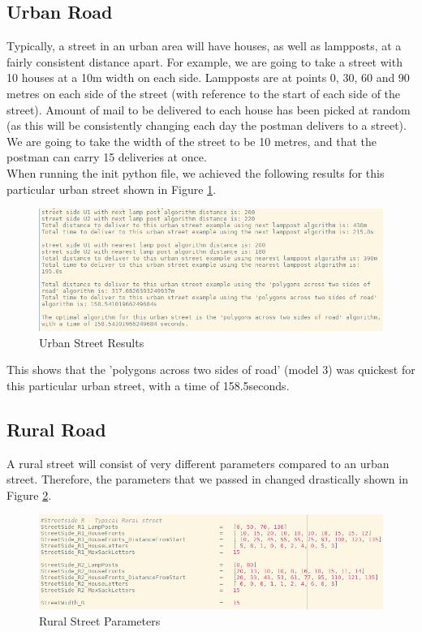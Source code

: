 \documentclass[14pt]{article}
\begin{document}
\subsection{Urban Road}
Typically, a street in an urban area will have houses, as well as lampposts, at a fairly consistent distance apart. For example, we are going to take a street with 10 houses at a 10m width on each side. Lampposts are at points 0, 30, 60 and 90 metres on each side of the street (with reference to the start of each side of the street). Amount of mail to be delivered to each house has been picked at random (as this will be consistently changing each day the postman delivers to a street). We are going to take the width of the street to be 10 metres, and that the postman can carry 15 deliveries at once. 
\\
When running the init python file, we achieved the following results for this particular urban street shown in Figure \ref{fig:Urban Street Results}. 

\begin{figure}[H]
\centering
\includegraphics[width = 430pt]{Images/UrbanStreetResults.png}
\caption{Urban Street Results}
\label{fig:Urban Street Results}
\end{figure}

This shows that the 'polygons across two sides of road' (model 3) was quickest for this particular urban street, with a time of 158.5seconds.  

\subsection{Rural Road}
A rural street will consist of very different parameters compared to an urban street. Therefore, the parameters that we passed in changed drastically shown in Figure \ref{fig:rural street parameters}. 

\begin{figure}[H]
\centering
\includegraphics[width = 430pt]{Images/RuralStreetParameters.png}
\caption{Rural Street Parameters}
\label{fig:rural street parameters}
\end{figure}
\end{document}
